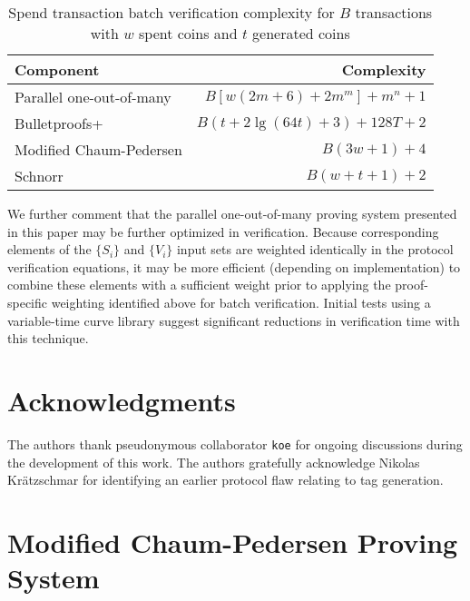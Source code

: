 \documentclass{llncs}
\begin{document}
\begin{table}
    \caption{Spend transaction batch verification complexity for $B$ transactions with $w$ spent coins and $t$ generated coins}
    \label{table:time}
    \centering
    \begin{tabular}{|l|r|}
        \hline
        \textbf{Component} & \textbf{Complexity} \\
        \hline
        Parallel one-out-of-many & $B[w(2m + 6) + 2m^m] + m^n + 1$ \\
        Bulletproofs+ & $B(t + 2\lg(64t) + 3) + 128T + 2$ \\
        Modified Chaum-Pedersen & $B(3w + 1) + 4$ \\
        Schnorr & $B(w + t + 1) + 2$ \\
        \hline
    \end{tabular}
\end{table}

We further comment that the parallel one-out-of-many proving system presented in this paper may be further optimized in verification.
Because corresponding elements of the $\{S_i\}$ and $\{V_i\}$ input sets are weighted identically in the protocol verification equations, it may be more efficient (depending on implementation) to combine these elements with a sufficient weight prior to applying the proof-specific weighting identified above for batch verification.
Initial tests using a variable-time curve library suggest significant reductions in verification time with this technique.


\section*{Acknowledgments}

The authors thank pseudonymous collaborator \texttt{koe} for ongoing discussions during the development of this work.
The authors gratefully acknowledge Nikolas Kr\"{a}tzschmar for identifying an earlier protocol flaw relating to tag generation.





\appendix


\section{Modified Chaum-Pedersen Proving System}
\label{app:chaum}
\end{document}
